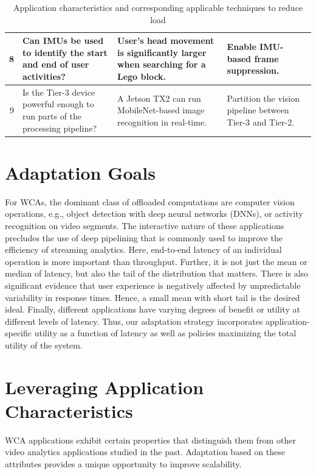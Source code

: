 \begin{table}[]
\begin{tabular}{|r|p{22ex}|p{30ex}|p{24ex}|}
    8&Can IMUs be used to identify the start and end of user activities?
        & User's head movement is significantly larger when searching for a Lego block.
        & Enable IMU-based frame suppression. \\ \hline
    9&Is the Tier-3 device powerful enough to run parts of the processing pipeline?
        & A Jetson TX2 can run MobileNet-based image recognition in real-time.
        & Partition the vision pipeline between Tier-3 and Tier-2.   \\ \hline
    \end{tabular}
\vspace{0.1in}
    \caption{\small Application characteristics and corresponding applicable techniques to reduce load}
    \label{tab:questions-techniques}
\end{table}

\section{Adaptation Goals}
 
For WCAs, the dominant class of offloaded computations are computer vision
operations, e.g., object detection with deep neural networks (DNNs), or activity
recognition on video segments. The interactive nature of these applications
precludes the use of deep pipelining that is commonly used to improve the
efficiency of streaming analytics.  Here, end-to-end latency of an individual
operation is more important than throughput. Further, it is not just the mean or
median of latency, but also the tail of the distribution that matters.  There is
also significant evidence that user experience is negatively affected by
unpredictable variability in response times. Hence, a small mean with short tail
is the desired ideal. Finally, different applications have varying degrees of
benefit or utility at different levels of latency.  Thus, our adaptation
strategy incorporates application-specific utility as a function of latency as
well as policies maximizing the total utility of the system.


\section{Leveraging Application Characteristics}
\label{sec:workload-reduction}

WCA applications exhibit certain properties that distinguish them from
other video analytics applications studied in the past.  Adaptation
based on these attributes provides a unique opportunity to improve
scalability.

